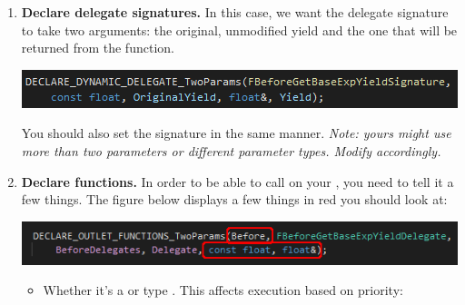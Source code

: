 \begin{enumerate}
	\item{\textbf{Declare delegate signatures.} In this case, we want the  delegate signature to take two arguments: the original, unmodified yield and the one that will be returned from the  function.\\
	\begin{center}
		\includegraphics[scale=\ScreenshotScale]{create-outlet-signature}
	\end{center}
	You should also set the  signature in the same manner. \textit{Note: yours might use more than two parameters or different parameter types. Modify accordingly.}
	}
	\item{\textbf{Declare  functions.} In order to be able to call  on your , you need to tell it a few things. The figure below displays a few things in red you should look at:\\
	\begin{center}
		\includegraphics[scale=\ScreenshotScale]{create-outlet-functions}
	\end{center}
		\begin{itemize}
			\item{Whether it's a  or  type . This affects execution based on priority:
			\begin{tcolorbox}[colback=gray!20!white,colframe=blue!75!black,title=Priorities]
			

\end{tcolorbox}}
\end{itemize}}
\end{enumerate}
